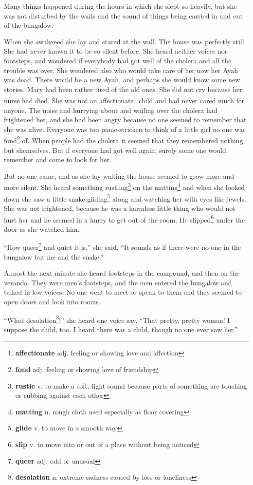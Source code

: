 Many things happened during the hours in which she slept so heavily, but she was not disturbed by the wails and the sound of things being carried in and out of the bungalow.

When she awakened she lay and stared at the wall. The house was perfectly still. She had never known it to be so silent before. She heard neither voices nor footsteps, and wondered if everybody had got well of the cholera and all the trouble was over. She wondered also who would take care of her now her Ayah was dead. There would be a new Ayah, and perhaps she would know some new stories. Mary had been rather tired of the old ones. She did not cry because her nurse had died. She was not an affectionate\footnote{\textbf{affectionate} adj. feeling or showing love and affection} child and had never cared much for anyone. The noise and hurrying about and wailing over the cholera had frightened her, and she had been angry because no one seemed to remember that she was alive. Everyone was too panic-stricken to think of a little girl no one was fond\footnote{\textbf{fond} adj. feeling or showing love of friendship} of. When people had the cholera it seemed that they remembered nothing but shemselves. But if everyone had got well again, surely some one would remember and come to look for her.

But no one came, and as she lay waiting the house seemed to grow more and more silent. She heard something rustling\footnote{\textbf{rustle} v. to make a soft, light sound because parts of something are touching or rubbing against each other} on the matting\footnote{\textbf{matting} n. rough cloth used especially as floor covering} and when she looked down she saw a little snake gliding\footnote{\textbf{glide} v. to move in a smooth way} along and watching her with eyes like jewels. She was not frightened, because he was a harmless little thing who would not hurt her and he seemed in a hurry to get out of the room. He slipped\footnote{\textbf{slip} v. to move into or out of a place without being noticed} under the door as she watched him.

``How queer\footnote{\textbf{queer} adj. odd or unusual} and quiet it is,'' she said. ``It sounds as if there were no one in the bungalow but me and the snake.''

Almost the next minute she heard footsteps in the compound, and then on the veranda. They were men's footsteps, and the men entered the bungalow and talked in low voices. No one went to meet or speak to them and they seemed to open doors and look into rooms.

``What desolation\footnote{\textbf{desolation} n. extreme sadness caused by loss or loneliness}!'' she heard one voice say. ``That pretty, pretty woman! I suppose the child, too. I heard there was a child, though no one ever saw her.''
